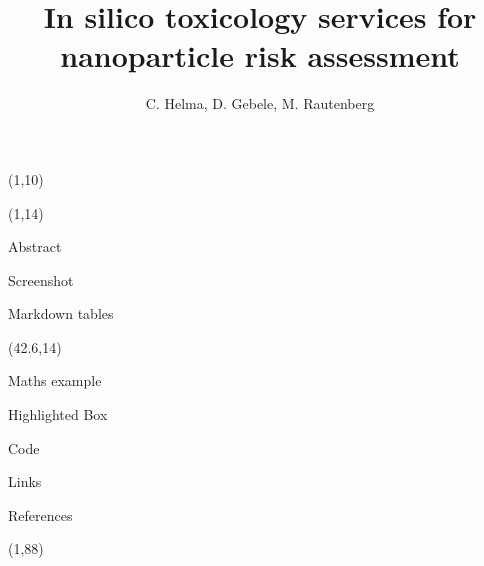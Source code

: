 \documentclass[final]{beamer}
\title{In silico toxicology services for nanoparticle risk assessment}
\author{C. Helma, D. Gebele, M. Rautenberg}
\institute{\emph{in silico} toxicology gmbh, Basel, Switzerland}
\begin{document}
  \begin{frame}{}

    \begin{textblock}{80}(1,10)
        
    \end{textblock}

    \begin{textblock}{40.5}(1,14)
      \begin{block}{Abstract}
        
      \end{block}

      \begin{block}{Screenshot}
        
      \end{block}

      \begin{block}{Markdown tables}
        
      \end{block}

    \end{textblock}

    \begin{textblock}{40.5}(42.6,14)

      \begin{block}{Maths example}
        
      \end{block}

      \begin{alertblock}{Highlighted Box}
        
      \end{alertblock}

      \begin{block}{Code}
        
      \end{block}

      \begin{exampleblock}{Links}
        
      \end{exampleblock}

      \begin{block}{References}
        \small
      \end{block}

    \end{textblock}

    \begin{textblock}{82.1}(1,88)
      
    \end{textblock}

  \end{frame}
\end{document}
